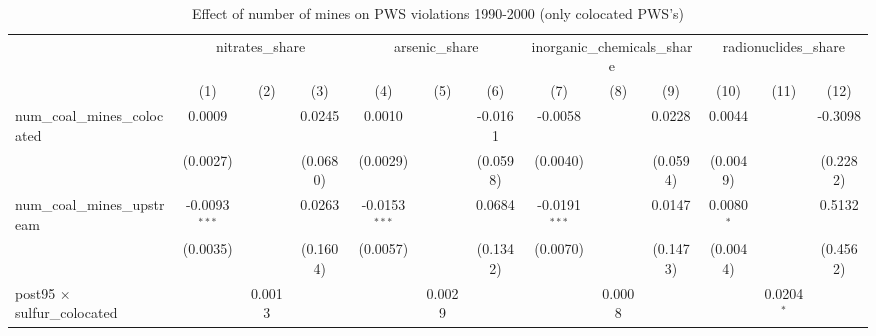 
\begin{table}[htbp]
   \caption{\label{olsrf2sls_nummine_mine_vio_1990to2000colocate} Effect of number of mines on PWS violations 1990-2000 (only colocated PWS's)}
   \bigskip
   \centering
   \begin{adjustbox}{width = \textwidth, center}
      \begin{tabular}{lcccccccccccc}
         \toprule
          & \multicolumn{3}{c}{nitrates\_share} & \multicolumn{3}{c}{arsenic\_share} & \multicolumn{3}{c}{inorganic\_chemicals\_share} & \multicolumn{3}{c}{radionuclides\_share}\\
                                                            & (1)             & (2)                   & (3)                   & (4)             & (5)                   & (6)                   & (7)             & (8)                   & (9)                   & (10)          & (11)                  & (12)\\  
         \midrule 
         num\_coal\_mines\_colocated                        & 0.0009          &                       & 0.0245                & 0.0010          &                       & -0.0161               & -0.0058         &                       & 0.0228                & 0.0044        &                       & -0.3098\\   
                                                            & (0.0027)        &                       & (0.0680)              & (0.0029)        &                       & (0.0598)              & (0.0040)        &                       & (0.0594)              & (0.0049)      &                       & (0.2282)\\   
         num\_coal\_mines\_upstream                         & -0.0093$^{***}$ &                       & 0.0263                & -0.0153$^{***}$ &                       & 0.0684                & -0.0191$^{***}$ &                       & 0.0147                & 0.0080$^{*}$  &                       & 0.5132\\   
                                                            & (0.0035)        &                       & (0.1604)              & (0.0057)        &                       & (0.1342)              & (0.0070)        &                       & (0.1473)              & (0.0044)      &                       & (0.4562)\\   
         post95 $\times$ sulfur\_colocated                  &                 & 0.0013                &                       &                 & 0.0029                &                       &                 & 0.0008                &                       &               & 0.0204$^{*}$          &   \\   

\end{tabular}
\end{adjustbox}
\end{table}
